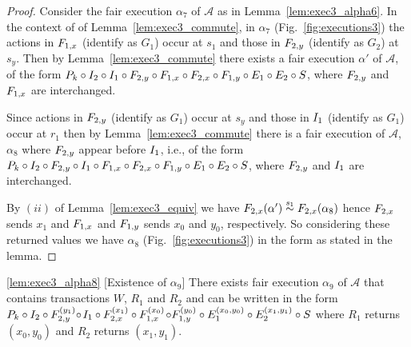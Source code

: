 \begin{proof}
 Consider the fair execution $\alpha_7$ of $\mathcal{A}$ as in Lemma~\ref{lem:exec3_alpha6}. In the context of 
  of  Lemma~\ref{lem:exec3_commute}, in $\alpha_7$ (Fig.~\ref{fig:executions3}) the actions in  
 $ \fragt{F_{1,x}}{\alpha_8}{}$ (identify as $G_1$)  occur at $s_1$  and  those in $\fragt{F_{2,y}}{\alpha_8}{}$ (identify as $G_2$) at  $s_y$. Then by  
 Lemma~\ref{lem:exec3_commute} there exists a fair execution $\alpha'$ of $\mathcal{A}$,  of the form 
 $ \finiteprefixA{k-1}{k}  \circ \fragt{I_2}{\alpha'}{}  \circ \fragt{I_1}{\alpha''}{} 
 \circ \fragn{F_{2,y}}{\alpha'}{y_1} 
\circ \fragn{F_{1,x}}{\alpha'}{x_0} 
\circ \fragn{F_{2,x}}{\alpha'}{x_1} 
 \circ \fragn{F_{1,y}}{\alpha'}{y_0} \circ\fragn{E_1}{\alpha'}{x_0, y_0}\circ
 \fragn{E_2}{\alpha''}{x_1, y_1}\circ \fragt{S}{\alpha'}{}$, where $ \fragt{F_{2,y}}{\alpha_8}{}$ and 
  $ \fragt{F_{1,x}}{\alpha_8}{}$  are interchanged.
 
 Since  actions in  $ \fragt{F_{2,y}}{\alpha_8}{}$ (identify as $G_1$)  occur at $s_y$ and those in 
  $ \fragt{I_{1}}{\alpha_8}{}$ (identify as $G_1$)  occur at $r_1$ then by Lemma~\ref{lem:exec3_commute}
  there is a  fair execution of $\mathcal{A}$, $\alpha_8$ where $\fragt{F_{2,y}}{\alpha_8}{}$ appear before $\fragt{I_1}{\alpha_8}{}$, i.e., of the form  $\finiteprefixA{k-1}{k}  \circ \fragt{I_2}{\alpha_8}{} \circ \fragt{F_{2,y}}{\alpha_8}{}  \circ
 \fragt{I_1}{\alpha_7}{} \circ \fragt{F_{1,x}}{\alpha_8}{} 
\circ \fragt{F_{2,x}}{\alpha_8}{} 
 \circ \fragt{F_{1,y}}{\alpha_8}{} \circ\fragt{E_1}{\alpha_8}{} \circ
 \fragt{E_2}{\alpha_8}{}\circ \fragt{S}{\alpha_8}{}$, where $ \fragt{F_{2,y}}{\alpha_8}{}$ and 
  $ \fragt{I_{1}}{\alpha_8}{}$  are interchanged.
 
 By $(ii)$ of Lemma~\ref{lem:exec3_equiv} we have 
$\frage{F_{2,x}}{\alpha'}{} \stackrel{s_1}{\sim} \frage{F_{2,x}}{\alpha_8}{}$ hence $\fragt{F_{2,x}}{\alpha_8}{}$ sends $x_1$ and 
$\fragt{F_{1,x}}{\alpha_8}{}$ and $\fragt{F_{1,y}}{\alpha_8}{}$ sends $x_0$ and $y_0$, respectively. So considering these returned values we have $\alpha_8$ 
(Fig.~\ref{fig:executions3}) in the form as stated in the lemma.
\end{proof}



\begin{lemma}\ref{lem:exec3_alpha8} [Existence of $\alpha_9$]   
\sloppy There exists  fair execution $\alpha_9$  of $\mathcal{A}$ that contains transactions $W$, $R_1$ and $R_2$
and   can be written in the form 
$\finiteprefixA{k-1}{k}  \circ  \fragt{I_2}{\alpha_8}{} \circ \fragt{F_{2,y}}{\alpha_8}{y_1} \circ 
$$\fragt{I_1}{\alpha_8}{} \circ \fragt{F_{2,x}}{\alpha_8}{x_1} 
\circ  \fragt{F_{1,x}}{\alpha_8}{x_0} 
$$ \circ \fragt{F_{1,y}}{\alpha_8}{y_0} \circ \fragt{E_1}{\alpha_8}{x_0, y_0}
\circ \fragt{E_2}{\alpha_8}{x_1, y_1}\circ \fragt{S}{\alpha_8}{}$
where $R_1$ returns $(x_0, y_0)$ and $R_2$ returns $(x_1, y_1)$.
\end{lemma}

